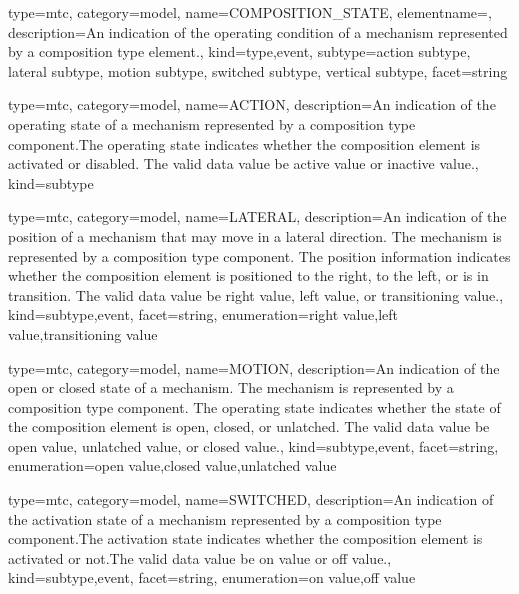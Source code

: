 {
  type=mtc,
  category=model,
  name={COMPOSITION\_STATE},
  elementname=,
  description={An indication of the operating condition of a mechanism represented by a \gls{composition} type element.},
  kind={type,event},
  subtype={\gls{action subtype}, \gls{lateral subtype}, \gls{motion subtype}, \gls{switched subtype}, \gls{vertical subtype}},
  facet={\gls{string}}
}


{
  type=mtc,
  category=model,
  name={ACTION},
  description={An indication of the operating state of a mechanism represented by a \gls{composition} type component.\newline The operating state indicates whether the \gls{composition} element is activated or disabled. \newline The \gls{valid data value} \must be \gls{active value} or \gls{inactive value}.},
  kind={subtype}
}


{
  type=mtc,
  category=model,
  name={LATERAL},
  description={An indication of the position of a mechanism that may move in a lateral direction.   The mechanism is represented by a \gls{composition} type component. \newline The position information indicates whether the \gls{composition} element is positioned to the right, to the left, or is in transition.  \newline The \gls{valid data value} \must be \gls{right value}, \gls{left value}, or \gls{transitioning value}.},
  kind={subtype,event},
  facet={\gls{string}},
  enumeration={\gls{right value},\gls{left value},\gls{transitioning value}}
}


{
  type=mtc,
  category=model,
  name={MOTION},
  description={An indication of the open or closed state of a mechanism.   The mechanism is represented by a \gls{composition} type component. \newline The operating state indicates whether the state of the \gls{composition} element is open, closed, or unlatched.   \newline The \gls{valid data value} \must be \gls{open value}, \gls{unlatched value}, or \gls{closed value}.},
  kind={subtype,event},
  facet={\gls{string}},
  enumeration={\gls{open value},\gls{closed value},\gls{unlatched value}}
}


{
  type=mtc,
  category=model,
  name={SWITCHED},
  description={An indication of the activation state of a mechanism represented by a \gls{composition} type component.\newline The activation state indicates whether the \gls{composition} element is activated or not.\newline The \gls{valid data value} \must be \gls{on value} or \gls{off value}.},
  kind={subtype,event},
  facet={\gls{string}},
  enumeration={\gls{on value},\gls{off value}}
}


